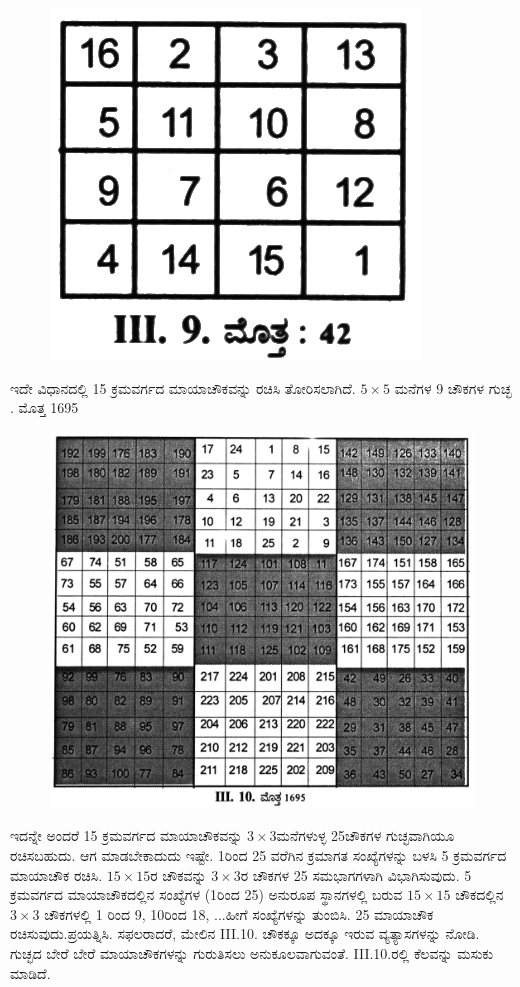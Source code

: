 \begin{itemize}
	\begin{figure}[H]
	\includegraphics[scale=.9]{src/figures/chap3/fig3.36.jpg}
	\end{figure}

	ಇದೇ ವಿಧಾನದಲ್ಲಿ 15 ಕ್ರಮವರ್ಗದ ಮಾಯಾಚೌಕವನ್ನು ರಚಿಸಿ ತೋರಿಸಲಾಗಿದೆ. $5 \times 5$ ಮನೆಗಳ 9 ಚೌಕಗಳ ಗುಚ್ಛ . ಮೊತ್ತ 1695
	\begin{figure}[!h]
	\includegraphics[scale=.8]{src/figures/chap3/fig3.37.jpg}
	\end{figure}

	ಇದನ್ನೇ ಅಂದರೆ 15 ಕ್ರಮವರ್ಗದ ಮಾಯಾಚೌಕವನ್ನು $3 \times 3$ಮನೆಗಳುಳ್ಳ 25\break ಚೌಕಗಳ ಗುಚ್ಛವಾಗಿಯೂ ರಚಿಸಬಹುದು. ಆಗ ಮಾಡಬೇಕಾದುದು ಇಷ್ಟೇ. 1ರಿಂದ 25 ವರೆಗಿನ ಕ್ರಮಾಗತ ಸಂಖ್ಯೆಗಳನ್ನು ಬಳಸಿ 5 ಕ್ರಮವರ್ಗದ ಮಾಯಾಚೌಕ ರಚಿಸಿ. $15 \times 15$ರ ಚೌಕವನ್ನು $3 \times 3$ರ ಚೌಕಗಳ 25 ಸಮಭಾಗಗಳಾಗಿ ವಿಭಾಗಿಸುವುದು. 5 ಕ್ರಮವರ್ಗದ ಮಾಯಾಚೌಕದಲ್ಲಿನ ಸಂಖ್ಯೆಗಳ (1ರಿಂದ 25) ಅನುರೂಪ ಸ್ಥಾನಗಳಲ್ಲಿ ಬರುವ $15 \times 15$ ಚೌಕದಲ್ಲಿನ $3 \times 3$ ಚೌಕಗಳಲ್ಲಿ 1 ರಿಂದ 9, 10ರಿಂದ 18, ...ಹೀಗೆ ಸಂಖ್ಯೆಗಳನ್ನು ತುಂಬಿಸಿ. 25 ಮಾಯಾಚೌಕ ರಚಿಸುವುದು.\break ಪ್ರಯತ್ನಿಸಿ. ಸಫಲರಾದರೆ, ಮೇಲಿನ  III.10. ಚೌಕಕ್ಕೂ ಅದಕ್ಕೂ ಇರುವ ವ್ಯತ್ಯಾಸ\-ಗಳನ್ನು ನೋಡಿ. ಗುಚ್ಛದ ಬೇರೆ ಬೇರೆ ಮಾಯಾಚೌಕಗಳನ್ನು ಗುರುತಿಸಲು ಅನು\-ಕೂಲವಾಗುವಂತೆ.  III.10.ರಲ್ಲಿ ಕೆಲವನ್ನು ಮಸುಕು ಮಾಡಿದೆ.


\end{itemize}
